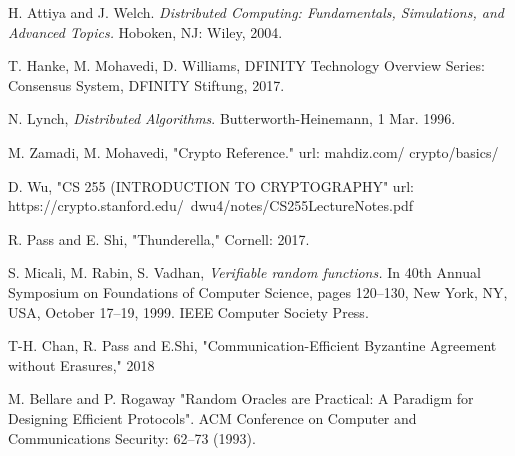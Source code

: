 \documentclass{article}
\begin{document}



\glsaddall

\printglossary[nonumberlist]


\begin{thebibliography}{999}

 H. Attiya and J. Welch. \emph{Distributed Computing: Fundamentals, Simulations, and Advanced Topics.} Hoboken, NJ: Wiley, 2004.

  T. Hanke, M. Mohavedi, D. Williams, DFINITY Technology Overview Series: Consensus System, DFINITY Stiftung, 2017.

 N. Lynch, \emph{Distributed Algorithms}. Butterworth-Heinemann, 1 Mar. 1996.


 M. Zamadi, M. Mohavedi, "Crypto Reference." url: mahdiz.com/ crypto/basics/

 D. Wu, "CS 255 (INTRODUCTION TO CRYPTOGRAPHY" url:  https://crypto.stanford.edu/~dwu4/notes/CS255LectureNotes.pdf

 R. Pass and E. Shi, "Thunderella," Cornell: 2017.

S. Micali, M. Rabin, S. Vadhan, \emph{Verifiable random functions.}
In 40th Annual Symposium on Foundations of Computer Science, pages 120–130,
New York, NY, USA, October 17–19, 1999. IEEE Computer Society Press.

 T-H. Chan, R. Pass and E.Shi, "Communication-Efficient Byzantine Agreement without Erasures," 2018

 M. Bellare and P. Rogaway "Random Oracles are Practical: A Paradigm for Designing Efficient Protocols". ACM Conference on Computer and Communications Security: 62–73 (1993).

\end{thebibliography}
\end{document}

